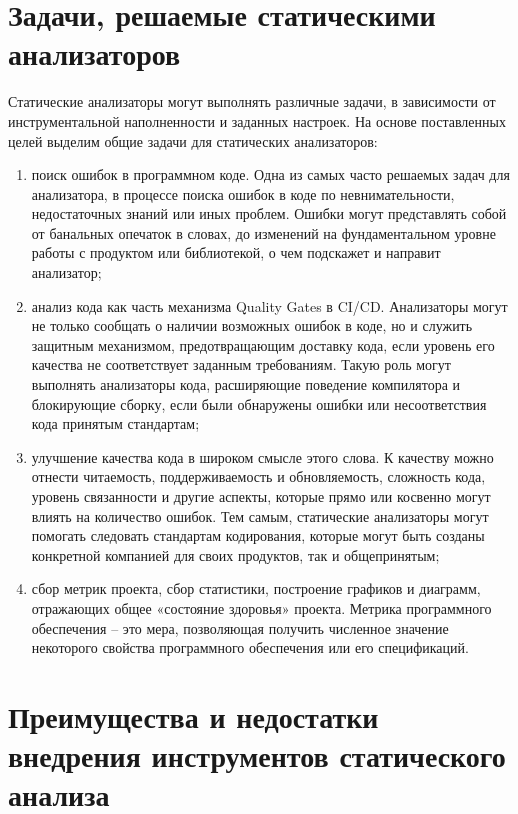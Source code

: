 \section{Задачи, решаемые статическими анализаторов}

Статические анализаторы могут выполнять различные задачи, в зависимости от инструментальной наполненности и заданных настроек. На основе поставленных целей выделим общие задачи для статических анализаторов:

\begin{enumerate}

    \item поиск ошибок в программном коде. Одна из самых часто решаемых задач для анализатора, в процессе поиска ошибок в коде по невнимательности, недостаточных знаний или иных проблем. Ошибки могут представлять собой от банальных опечаток в словах, до изменений на фундаментальном уровне работы с продуктом или библиотекой, о чем подскажет и направит анализатор;
    
    \item анализ кода как часть механизма Quality Gates в CI/CD. Анализаторы могут не только сообщать о наличии возможных ошибок в коде, но и служить защитным механизмом, предотвращающим доставку кода, если уровень его качества не соответствует заданным требованиям. Такую роль могут выполнять анализаторы кода, расширяющие поведение компилятора и блокирующие сборку, если были обнаружены ошибки или несоответствия кода принятым стандартам;
      
    \item улучшение качества кода в широком смысле этого слова. К качеству можно отнести читаемость, поддерживаемость и обновляемость, сложность кода, уровень связанности и другие аспекты, которые прямо или косвенно могут влиять на количество ошибок. Тем самым, статические анализаторы могут помогать следовать стандартам кодирования, которые могут быть созданы конкретной компанией для своих продуктов, так и общепринятым;
        
    \item сбор метрик проекта, сбор статистики, построение графиков и диаграмм, отражающих общее «состояние здоровья» проекта.  Метрика программного обеспечения -- это мера, позволяющая получить численное значение некоторого свойства программного обеспечения или его спецификаций.
          
\end{enumerate}

\section{Преимущества и недостатки внедрения инструментов статического анализа}

